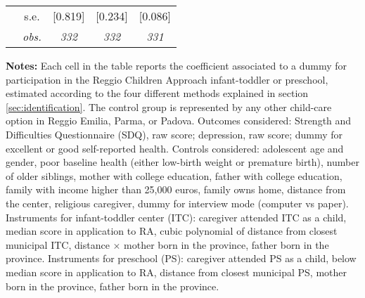 \begin{table}[H]
\begin{centering}
\begin{tabular}{ r c ccc}
	 & s.e.	 & [0.819]	 & [0.234]	 & [0.086]	\\
	 & \textit{obs.}	 & \textit{332}	 & \textit{332}	 & \textit{331}	\\
\hline 
\end{tabular} 
\par\end{centering} 
\vspace{2ex}
\begin{footnotesize} 
\textbf{Notes:} Each cell in the table reports the coefficient associated to a dummy for participation in the Reggio Children Approach infant-toddler or preschool, estimated according to the four different methods explained in section  \ref{sec:identification}.
The control group is represented by any other child-care option in Reggio Emilia, Parma, or Padova.
Outcomes considered: Strength and Difficulties Questionnaire (SDQ), raw score; depression, raw score; dummy for excellent or good self-reported health. Controls considered: adolescent age and gender, poor baseline health (either low-birth weight or premature birth), number of older siblings, mother with college education, father with college education, family with income higher than 25,000 euros, family owns home, distance from the center, religious caregiver, dummy for interview mode (computer vs paper). 
Instruments for infant-toddler center (ITC): caregiver attended ITC as a child, median score in application to RA, cubic polynomial of distance from closest municipal ITC, distance $\times$ mother born in the province, father born in the province.
Instruments for preschool (PS): caregiver attended PS as a child, below median score in application to RA, distance from closest municipal PS, mother born in the province, father born in the province.
\end{footnotesize}
\end{table}
